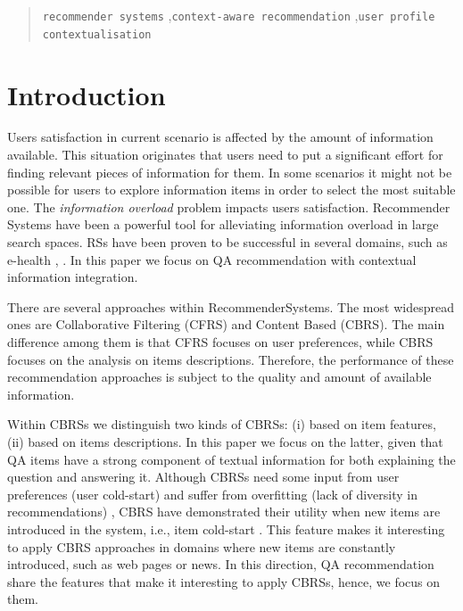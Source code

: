 \documentclass[preprint]{elsarticle}
\begin{document}
\begin{spacing}{2}
\begin{frontmatter}
\begin{abstract}
\begin{keyword}
   \texttt{recommender systems} \sep \texttt{context-aware recommendation} \sep \texttt{user profile contextualisation}
\end{keyword}
\end{abstract}

\end{frontmatter}

\section{Introduction}\label{sec:introduction}

Users satisfaction in current scenario is affected by the amount of information available. This situation originates that users need to put a significant effort for finding relevant pieces of information for them. In some scenarios it might not be possible for users to explore information items in order to select the most suitable one. The \emph{information overload} problem impacts users satisfaction. Recommender Systems have been a powerful tool for alleviating information overload in large search spaces. RSs have been proven to be successful in several domains, such as e-health \cite{}, \cite{}. In this paper we focus on QA recommendation with contextual information integration.

There are several approaches within RecommenderSystems. The most widespread ones are Collaborative Filtering (CFRS) and Content Based (CBRS). The main difference among them is that CFRS focuses on user preferences, while CBRS focuses on the analysis on items descriptions. Therefore, the performance of these recommendation approaches is subject to the quality and amount of available information.

Within CBRSs we distinguish two kinds of CBRSs: (i) based on item features, (ii) based on items descriptions. In this paper we focus on the latter, given that QA items have a strong component of textual information for both explaining the question and answering it. Although CBRSs need some input from user preferences (user cold-start) and suffer from overfitting (lack of diversity in recommendations) \cite{}, CBRS have demonstrated their utility when new items are introduced in the system, i.e., item cold-start \cite{Aggarwal2016}. This feature makes it interesting to apply CBRS approaches in domains where new items are constantly introduced, such as web pages or news. In this direction, QA recommendation share the features that make it interesting to apply CBRSs, hence, we focus on them.


\end{spacing}
\end{document}
